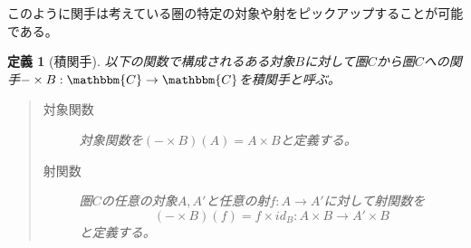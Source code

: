 \documentclass[dvipdfmx]{jsarticle}
\newcommand{\cat}[1]{\mathbbm{#1}}
\newcommand{\arrow}{\rightarrow}
\newcommand{\functor}[3]{#1:\cat{#2}\arrow \cat{#3}}
\newcommand{\mor}[3]{#1:#2\arrow #3}
\newtheorem{define}{定義}[section]
\numberwithin{proof}{subsection}
\numberwithin{prop}{subsection}
\numberwithin{define}{subsection}
\begin{document}
	このように関手は考えている圏の特定の対象や射をピックアップすることが可能である。
	\begin{define}[積関手]
		以下の関数で構成されるある対象$B$に対して圏$C$から圏$C$への関手$\functor{-\times B}{C}{C}$を積関手と呼ぶ。
		\begin{quote}
			\begin{description}
			\item[対象関数] 対象関数を$(-\times B)(A)=A\times B$と定義する。
			\item[射関数] 圏$C$の任意の対象$A,A'$と任意の射$\mor{f}{A}{A'}$に対して射関数を\[\mor{(-\times B)(f)=f\times id_B}{A\times B}{A'\times B}\]と定義する。
			\begin{center}
\end{center}
\end{description}
\end{quote}
\end{define}
\end{document}
